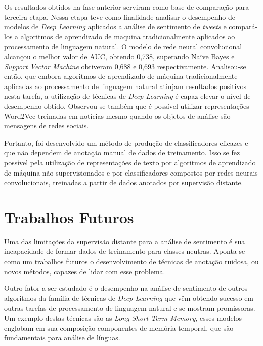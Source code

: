 Os resultados obtidos na fase anterior serviram como base de comparação para terceira etapa.
Nessa etapa teve como finalidade analisar o desempenho de modelos de \textit{Deep Learning} aplicados a
análise de sentimento de \textit{tweets} e compará-los a algoritmos de aprendizado de maquina tradicionalmente aplicados
ao processamento de linguagem natural.
O modelo de rede neural convolucional alcançou o melhor valor de AUC, obtendo 0,738, superando Naïve Bayes e
\textit{Support Vector Machine} obtiveram 0,688 e 0,693 respectivamente.
Analisou-se então, que embora algoritmos de aprendizado de máquina tradicionalmente aplicadas ao processamento de linguagem
natural atinjam resultados positivos nesta tarefa, a utilização de técnicas de \textit{Deep Learning} é capaz elevar o
nível de desempenho obtido.
Observou-se também que é possível utilizar representações Word2Vec treinadas em notícias mesmo quando os objetos de análise
são mensagens de redes sociais.

Portanto, foi desenvolvido um método de produção de classificadores eficazes e que não dependem de anotação manual de
dados de treinamento.
Isso se fez possível pela utilização de representações de texto por algoritmos de aprendizado de máquina não
supervisionados e por classificadores compostos por redes neurais convolucionais, treinadas a partir de dados anotados
por supervisão distante.

\section{Trabalhos Futuros}

Uma das limitações da supervisão distante para a análise de sentimento é sua incapacidade de formar dados de treinamento
para classes neutras.
Aponta-se como um trabalhos futuros o desenvolvimento de técnicas de anotação ruidosa, ou novos métodos, capazes de lidar
com esse problema.

Outro fator a ser estudado é o desempenho na análise de sentimento de outros algoritmos da família de técnicas de
\textit{Deep Learning} que vêm obtendo sucesso em outras tarefas de processamento de linguagem natural e se mostram promissoras.
Um exemplo destas técnicas são as \textit{Long Short Term Memory}, esses modelos englobam em sua composição componentes
de memória temporal, que são fundamentais para análise de línguas.
